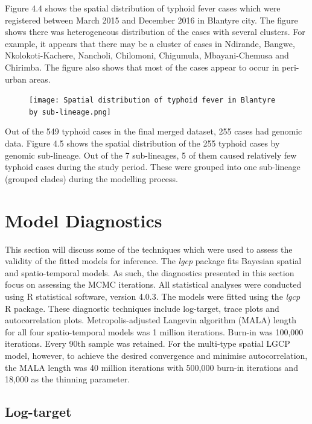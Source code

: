 \documentclass[12pt,a4paper]{report}
\begin{document}
Figure 4.4 shows the spatial distribution of typhoid fever cases which were registered between March 2015 and December 2016 in Blantyre city. The figure shows there was heterogeneous distribution of the cases with several clusters. For example, it appears that there may be a cluster of cases in Ndirande, Bangwe, Nkolokoti-Kachere, Nancholi, Chilomoni, Chigumula, Mbayani-Chemusa and Chirimba. The figure also shows that most of the cases appear to occur in peri-urban areas.


\begin{figure}[H]
\begin{center}
\texttt{[image: Spatial distribution of typhoid fever in Blantyre by sub-lineage.png]}
\end{center}
\end{figure}

Out of the 549 typhoid cases in the final merged dataset, 255 cases had genomic data. Figure 4.5 shows the spatial distribution of the 255 typhoid cases by genomic sub-lineage. Out of the 7 sub-lineages, 5 of them caused relatively few typhoid cases during the study period. These were grouped into one sub-lineage (grouped clades) during the modelling process.

\section{Model Diagnostics}

This section will discuss some of the techniques which were used to assess the validity of the fitted models for inference. The \textit{lgcp} package fits Bayesian spatial and spatio-temporal models. As such, the diagnostics presented in this section focus on assessing the MCMC iterations. All statistical analyses were conducted using R statistical software, version 4.0.3. The models were fitted using the \textit{lgcp} R package. These diagnostic techniques include log-target, trace plots and autocorrelation plots. Metropolis-adjusted Langevin algorithm
(MALA) length for all four spatio-temporal models was 1 million iterations. Burn-in was 100,000 iterations. Every 90th sample was retained. For the multi-type spatial LGCP model, however, to achieve the desired convergence and minimise autocorrelation, the MALA length was 40 million iterations with 500,000 burn-in iterations and 18,000 as the thinning parameter.

\subsection{Log-target}
\end{document}
